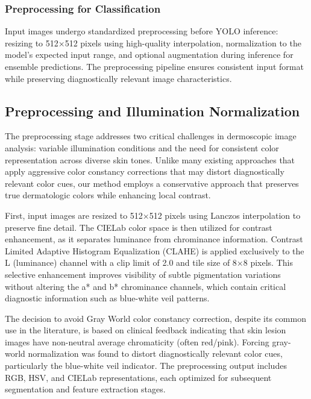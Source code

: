 \documentclass[conference]{IEEEtran}
\begin{document}
\subsubsection{Preprocessing for Classification}

Input images undergo standardized preprocessing before YOLO inference: resizing to 512×512 pixels using high-quality interpolation, normalization to the model's expected input range, and optional augmentation during inference for ensemble predictions. The preprocessing pipeline ensures consistent input format while preserving diagnostically relevant image characteristics.

\subsection{Preprocessing and Illumination Normalization}

The preprocessing stage addresses two critical challenges in dermoscopic image analysis: variable illumination conditions and the need for consistent color representation across diverse skin tones. Unlike many existing approaches that apply aggressive color constancy corrections that may distort diagnostically relevant color cues, our method employs a conservative approach that preserves true dermatologic colors while enhancing local contrast.


First, input images are resized to 512×512 pixels using Lanczos interpolation to preserve fine detail. The CIELab color space is then utilized for contrast enhancement, as it separates luminance from chrominance information. Contrast Limited Adaptive Histogram Equalization (CLAHE) is applied exclusively to the L (luminance) channel with a clip limit of 2.0 and tile size of 8×8 pixels. This selective enhancement improves visibility of subtle pigmentation variations without altering the a* and b* chrominance channels, which contain critical diagnostic information such as blue-white veil patterns.

The decision to avoid Gray World color constancy correction, despite its common use in the literature, is based on clinical feedback indicating that skin lesion images have non-neutral average chromaticity (often red/pink). Forcing gray-world normalization was found to distort diagnostically relevant color cues, particularly the blue-white veil indicator. The preprocessing output includes RGB, HSV, and CIELab representations, each optimized for subsequent segmentation and feature extraction stages.
\end{document}
